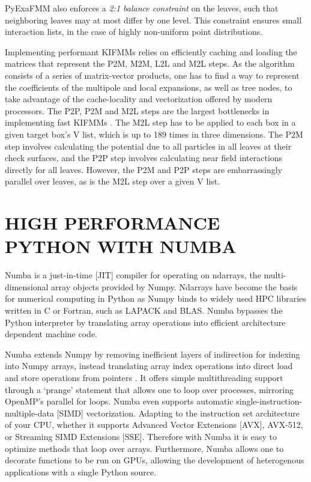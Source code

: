 \documentclass{IEEEcsmag}
\begin{document}
PyExaFMM also enforces a \textit{2:1 balance constraint} on the leaves, such that neighboring leaves may at most differ by one level. This constraint ensures small interaction lists, in the case of highly non-uniform point distributions.

Implementing performant KIFMMs relies on efficiently caching and loading the matrices that represent the P2M, M2M, L2L and M2L steps. As the algorithm consists of a series of matrix-vector products, one has to find a way to represent the coefficients of the multipole and local expansions, as well as tree nodes, to take advantage of the cache-locality and vectorization offered by modern processors. The P2P, P2M and M2L steps are the largest bottlenecks in implementing fast KIFMMs \cite{Lashuk2012}. The M2L step has to be applied to each box in a given target box's V list, which is up to 189 times in three dimensions. The P2M step involves calculating the potential due to all particles in all leaves at their check surfaces, and the P2P step involves calculating near field interactions directly for all leaves. However, the P2M and P2P steps are embarrassingly parallel over leaves, as is the M2L step over a given V list.

\section{HIGH PERFORMANCE PYTHON WITH NUMBA}

Numba is a just-in-time [JIT] compiler for operating on ndarrays, the multi-dimensional array objects provided by Numpy. Ndarrays have become the basis for numerical computing in Python as Numpy binds to widely used HPC libraries written in C or Fortran, such as LAPACK and BLAS. Numba bypasses the Python interpreter by translating array operations into efficient architecture dependent machine code.

Numba extends Numpy by removing inefficient layers of indirection for indexing into Numpy arrays, instead translating array index operations into direct load and store operations from pointers \cite{Lam2015}. It offers simple multithreading support through a `prange' statement that allows one to loop over processes, mirroring OpenMP's parallel for loops. Numba even supports automatic single-instruction-multiple-data [SIMD] vectorization. Adapting to the instruction set architecture of your CPU, whether it supports Advanced Vector Extensions [AVX], AVX-512, or  Streaming SIMD Extensions [SSE]. Therefore with Numba it is easy to optimize methods that loop over arrays. Furthermore, Numba allows one to decorate functions to be run on GPUs, allowing the development of heterogenous applications with a single Python source.
\end{document}
